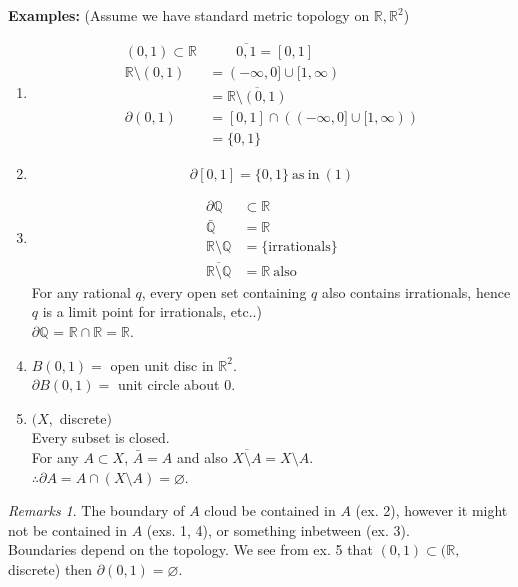 \documentclass{article}
\newcommand{\R}{\mathbb{R}}
\newcommand{\Q}{\mathbb{Q}}
\renewcommand{\emptyset}{\varnothing}
\theoremstyle{remark}
\theoremstyle{example}
\theoremstyle{examples}
\newtheorem*{remarks}{Remarks}
\begin{document}
	\textbf{Examples:} (Assume we have standard metric topology on $\R, \R^2$)\\
	\begin{enumerate}
		\item \begin{align*}
			(0,1) \subset \R & \qquad  \overline{0,1} = [0,1]\\
			\R \setminus (0,1) &= (-\infty, 0] \cup [1, \infty)\\
			& = \overline{\R \setminus (0,1)}\\
			\partial(0,1) & =[0,1] \cap \left((-\infty,0] \cup [1,\infty)\right)\\
			& = \{0,1\}
		\end{align*}
		\item \[\partial [0,1] = \{0,1\}\ \mathrm{as\ in\ } (1)\]
		\item \begin{align*}
			\partial \Q & \subset \R\\
			\bar{\Q} &= \R\\
			\R \setminus \Q & = \{\mathrm{irrationals}\}\\
			\overline{\R \setminus \Q} & = \R \mathrm{\ also}			
		\end{align*}
		For any rational $q$, every open set containing $q$ also contains irrationals, hence $q$ is a limit point for {irrationals}, etc..)\\
		$\partial \Q$ = $\R \cap \R = \R$.
		\item $B(0,1) = $ open unit disc in $\R^2$.\\
		$\partial B(0,1)=$ unit circle about $0$.
		\item $(X,$ discrete$)$\\
		Every subset is closed.\\
		For any $A \subset X$, $\bar{A} = A$ and also $\overline{X \setminus A} = X \setminus A$.\\
		$\therefore\partial{A} = A \cap (X \setminus A) = \emptyset$.
	\end{enumerate}

	\begin{remarks}
		The boundary of $A$ cloud be contained in $A$ (ex. 2), however it might not be contained in $A$ (exs. 1, 4), or something inbetween (ex. 3).\\
		Boundaries depend on the topology. We see from ex. 5 that $(0,1) \subset (\R,$ discrete) then $\partial (0,1) = \emptyset$.
	\end{remarks}
\end{document}
